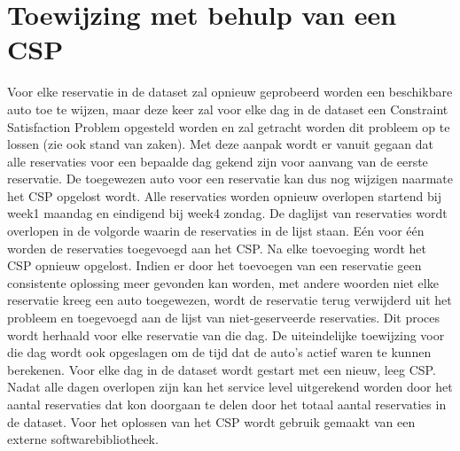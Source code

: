 \section{Toewijzing met behulp van een CSP} \label{csp-toewijzing}
Voor elke reservatie in de dataset zal opnieuw geprobeerd worden een beschikbare auto toe te wijzen, maar deze keer zal voor elke dag in de dataset een Constraint Satisfaction Problem opgesteld worden en zal getracht worden dit probleem op te lossen (zie ook stand van zaken). Met deze aanpak wordt er vanuit gegaan dat alle reservaties voor een bepaalde dag gekend zijn voor aanvang van de eerste reservatie. De toegewezen auto voor een reservatie kan dus nog wijzigen naarmate het CSP opgelost wordt. Alle reservaties worden opnieuw overlopen startend bij week1 maandag en eindigend bij week4 zondag. De daglijst van reservaties wordt overlopen in de volgorde waarin de reservaties in de lijst staan. Eén voor één worden de reservaties toegevoegd aan het CSP. Na elke toevoeging wordt het CSP opnieuw opgelost. Indien er door het toevoegen van een reservatie geen consistente oplossing meer gevonden kan worden, met andere woorden niet elke reservatie kreeg een auto toegewezen, wordt de reservatie terug verwijderd uit het probleem en toegevoegd aan de lijst van niet-geserveerde reservaties. Dit proces wordt herhaald voor elke reservatie van die dag. De uiteindelijke toewijzing voor die dag wordt ook opgeslagen om de tijd dat de auto's actief waren te kunnen berekenen. Voor elke dag in de dataset wordt gestart met een nieuw, leeg CSP. Nadat alle dagen overlopen zijn kan het service level uitgerekend worden door het aantal reservaties dat kon doorgaan te delen door het totaal aantal reservaties in de dataset. Voor het oplossen van het CSP wordt gebruik gemaakt van een externe softwarebibliotheek.





